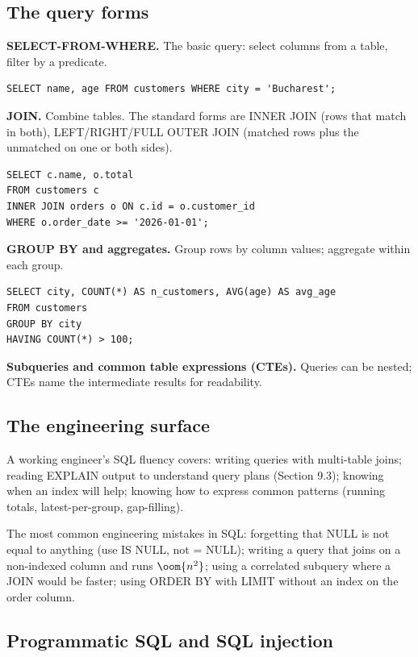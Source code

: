 \subsection{The query forms}

\textbf{SELECT-FROM-WHERE.} The basic query: select columns from a table, filter by a predicate.

\begin{verbatim}
SELECT name, age FROM customers WHERE city = 'Bucharest';
\end{verbatim}

\textbf{JOIN.} Combine tables. The standard forms are INNER JOIN (rows that match in both), LEFT/RIGHT/FULL OUTER JOIN (matched rows plus the unmatched on one or both sides).

\begin{verbatim}
SELECT c.name, o.total
FROM customers c
INNER JOIN orders o ON c.id = o.customer_id
WHERE o.order_date >= '2026-01-01';
\end{verbatim}

\textbf{GROUP BY and aggregates.} Group rows by column values; aggregate within each group.

\begin{verbatim}
SELECT city, COUNT(*) AS n_customers, AVG(age) AS avg_age
FROM customers
GROUP BY city
HAVING COUNT(*) > 100;
\end{verbatim}

\textbf{Subqueries and common table expressions (CTEs).} Queries can be nested; CTEs name the intermediate results for readability.

\subsection{The engineering surface}

A working engineer's SQL fluency covers: writing queries with multi-table joins; reading EXPLAIN output to understand query plans (Section 9.3); knowing when an index will help; knowing how to express common patterns (running totals, latest-per-group, gap-filling).

The most common engineering mistakes in SQL: forgetting that NULL is not equal to anything (use IS NULL, not = NULL); writing a query that joins on a non-indexed column and runs $\oom{n^2}$; using a correlated subquery where a JOIN would be faster; using ORDER BY with LIMIT without an index on the order column.

\subsection{Programmatic SQL and SQL injection}

